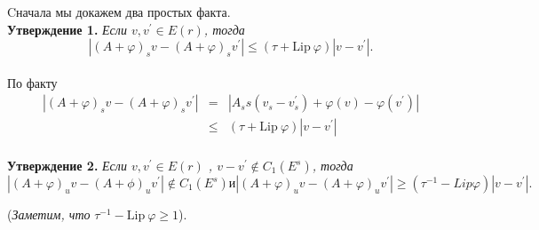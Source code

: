 \begin{demo}
Cначала мы докажем два простых факта.\\
\textbf{Утверждение 1.} \textit{Если $v, v^{\prime} \in E(r)$, тогда}
$$
|(A+ \varphi)_s v - (A+\varphi)_s v^{\prime} | \leqslant (\tau + \mathrm{Lip} \ \varphi) |v-v^{ \prime} |.
$$
\\
По факту 
$$
\begin{array}{lclll}
|(A + \varphi)_s v - (A + \varphi)_s v^{\prime} | & = & |A_ss  (v_s-v_s^{\prime}) + \varphi(v) - \varphi(v^{\prime})| \\
& \leqslant & (\tau + \mathrm{Lip} \ \varphi)|v-v^{\prime} |
\end{array}
$$
\\
\textbf{Утверждение 2.} \textit{Если $v, v^{\prime} \in E(r)$ ,  $ v-v^{\prime} \notin C_1(E^s)$, тогда}
$$
|(A + \varphi)_u v - (A + \phi)_u v^{\prime}| \notin C_1(E^s)
\textit{и}
|(A + \varphi)_u v - (A + \varphi)_u v^{\prime}| \geqslant (\tau^{-1} - Lip\varphi)|v-v^{\prime}|.
$$

(\textit{Заметим, что} $\tau^{-1} - \mathrm{Lip} \ \varphi \geqslant 1$).


\end{demo}
